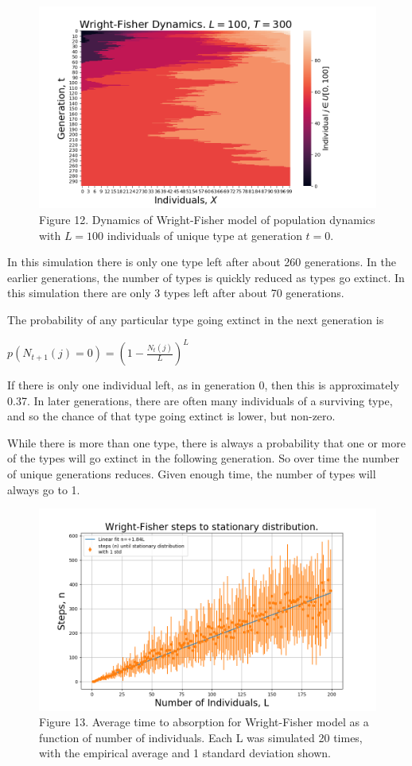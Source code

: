 \documentclass{article}
\begin{document}
\begin{figure}[H]
\includegraphics[scale=0.6]{Wright-Fisher_a.png} 
\small{Figure 12. Dynamics of Wright-Fisher model of population dynamics with $L=100$ individuals of unique type at generation $t=0$.}
\end{figure}


In this simulation there is only one type left after about 260 generations. In the earlier generations, the number of types is quickly reduced as types go extinct. In this simulation there are only 3 types left after about 70 generations. 

The probability of any particular type going extinct in the next generation is

$p(N_{t+1}(j) = 0) = (1-\frac{N_t(j)}{L})^{L}$


If there is only one individual left, as in generation 0, then this is approximately 0.37. In later generations, there are often many individuals of a surviving type, and so the chance of that type going extinct is lower, but non-zero.

While there is more than one type, there is always a probability that one or more of the types will go extinct in the following generation. So over time the number of unique generations reduces. Given enough time, the number of types will always go to 1. 


\begin{figure}[H]
\includegraphics[scale=0.5]{Wright_Fisher_absorption_a.png} 
\small{Figure 13. Average time to absorption for Wright-Fisher model as a function of number of individuals. Each L was simulated 20 times, with the empirical average and 1 standard deviation shown.}
\end{figure}
\end{document}
